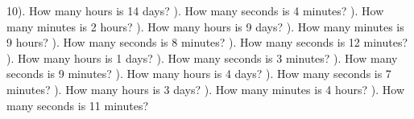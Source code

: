 \documentclass{article}%
\begin{document}
10). How many hours is 14 days?%
\newline%
\newline%
). How many seconds is 4 minutes?%
\newline%
\newline%
). How many minutes is 2 hours?%
\newline%
\newline%
). How many hours is 9 days?%
\newline%
\newline%
). How many minutes is 9 hours?%
\newline%
\newline%
). How many seconds is 8 minutes?%
\newline%
\newline%
). How many seconds is 12 minutes?%
\newline%
\newline%
). How many hours is 1 days?%
\newline%
\newline%
). How many seconds is 3 minutes?%
\newline%
\newline%
). How many seconds is 9 minutes?%
\newline%
\newline%
). How many hours is 4 days?%
\newline%
\newline%
). How many seconds is 7 minutes?%
\newline%
\newline%
). How many hours is 3 days?%
\newline%
\newline%
). How many minutes is 4 hours?%
\newline%
\newline%
). How many seconds is 11 minutes?%
\end{document}
